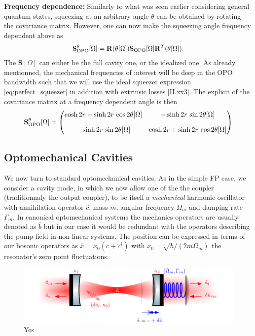 \noindent\textbf{Frequency dependence: } Similarly to what was seen earlier considering general quantum states, squeezing at an arbitrary angle $\theta$ can be obtained by rotating the covariance matrix. However, one can now make the squeezing angle frequency dependent
above as
\begin{equation}
\mathbf{S}^{\theta}_{\rm OPO}[\Omega] = \mathbf R(\theta[\Omega])
\mathbf{S}_{\rm OPO}[\Omega] 
\mathbf R^{T}(\theta[\Omega]).
\label{II.xx4}
\end{equation}
The $\mathbf{S}[\Omega]$ can either be the full cavity one, or the idealized one. As already mentionned, the mechanical frequencies of interest will be deep in the OPO bandwidth such that we will use the ideal squeezer expression \eqref{eq:perfect_squeezer} in addition with extrinsic losses \eqref{II.xx3}. The explicit of the covariance matrix at a frequency dependent angle is then
\begin{equation}
      \mathbf{S}^{\theta}_{\rm OPO}[\Omega] =\begin{pmatrix}
         \cosh 2r  - \sinh 2r \, \cos 2\theta[\Omega]  & -\sinh 2r \, \sin 2\theta[\Omega]  \\[10pt]
        -\sinh 2r \, \sin 2\theta[\Omega]  & \cosh 2r  + \sinh 2r \, \cos 2\theta[\Omega] 
      \end{pmatrix}
\end{equation}


\subsection{Optomechanical Cavities}
We now turn to standard optomechanical cavities. As in the simple FP case, we consider a cavity mode, in which we now allow one of the the coupler (traditionnaly the output coupler), to be itself a \textit{mechanical} harmonic oscillator with annihilation operator $\hat{c}$, mass $m$, angular frequency $\Omega_m$ and damping rate $\Gamma_m$. In canonical optomechanical systems the mechanics operators are usually denoted as $\hat b$ but in our case it would be redundant with the operators describing the pump field in non linear systems. The position can be expressed in terms of our bosonic operators as  $\hat{x}=x_0(\hat{c}+\hat{c}^{\dagger})$ with $x_0 = \sqrt{\hbar/(2m\Omega_m)}$ the resonator's zero point fluctuations. 

\begin{figure}[h!]
\centering
\includegraphics[width=\textwidth]{./chap2/fig/CavityOM.pdf}
\caption{Yes} 
\label{fig:cavity_types}
\end{figure}

